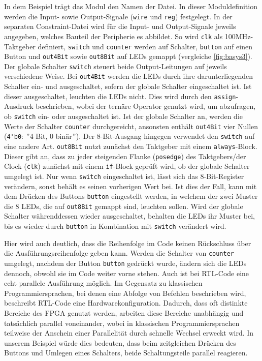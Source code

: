     In dem Beispiel trägt das Modul den Namen der Datei.
    In dieser Moduldefinition werden die Input- sowie Output-Signale (\verb|wire| und \verb|reg|) festgelegt.
    In der separaten Constraint-Datei wird für die Input- und Output-Signale jeweils angegeben, welches Bauteil der Peripherie es abbildet.
    So wird \verb|clk| als 100MHz-Taktgeber definiert, \verb|switch| und \verb|counter| werden auf Schalter, \verb|button| auf einen Button und \verb|out4Bit| sowie \verb|out8Bit| auf LEDs gemappt (vergleiche \cref{fig:basys3}).
    Der globale Schalter \verb|switch| steuert beide Output-Leitungen auf jeweils verschiedene Weise.
    Bei \verb|out4Bit| werden die LEDs durch ihre darunterliegenden Schalter ein- und ausgeschaltet, sofern der globale Schalter eingeschaltet ist.
    Ist dieser ausgeschaltet, leuchten die LEDs nicht.
    Dies wird durch den \verb|assign|-Ausdruck beschrieben, wobei der ternäre Operator genutzt wird, um abzufragen, ob \verb|switch| ein- oder ausgeschaltet ist.
    Ist der globale Schalter an, werden die Werte der Schalter \verb|counter| durchgereicht, ansonsten enthält \verb|out4Bit| vier Nullen (\verb|4'b0|: \("\)4 Bit, 0 binär\("\)).
    Der 8-Bit-Ausgang hingegen verwendet den \verb|switch| auf eine andere Art.
    \verb|out8Bit| nutzt zunächst den Taktgeber mit einem \verb|always|-Block.
    Dieser gibt an, dass zu jeder steigenden Flanke (\verb|posedge|) des Taktgebers/der Clock (\verb|clk|) zunächst mit einem \verb|if|-Block geprüft wird, ob der globale Schalter umgelegt ist.
    Nur wenn \verb|switch| eingeschaltet ist, lässt sich das 8-Bit-Register verändern, sonst behält es seinen vorherigen Wert bei.
    Ist dies der Fall, kann mit dem Drücken des Buttons \verb|button| eingestellt werden, in welchem der zwei Muster die 8 LEDs, die auf \verb|out8Bit| gemappt sind, leuchten sollen.
    Wird der globale Schalter währenddessen wieder ausgeschaltet, behalten die LEDs ihr Muster bei, bis es wieder durch \verb|button| in Kombination mit \verb|switch| verändert wird.

    Hier wird auch deutlich, dass die Reihenfolge im Code keinen Rückschluss über die Ausführungsreihenfolge geben kann.
    Werden die Schalter von \verb|counter| umgelegt, nachdem der Button \verb|button| gedrückt wurde, ändern sich die LEDs dennoch, obwohl sie im Code weiter vorne stehen.
    Auch ist bei RTL-Code eine echt parallele Ausführung möglich.
    Im Gegensatz zu klassischen Programmiersprachen, bei denen eine Abfolge von Befehlen beschrieben wird, beschreibt RTL-Code eine Hardwarekonfiguration.
    Dadurch, dass oft distinkte Bereiche des FPGA genutzt werden, arbeiten diese Bereiche unabhängig und tatsächlich parallel voneinander, wobei in klassischen Programmiersprachen teilweise der Anschein einer Parallelität durch schnelle Wechsel erweckt wird.
    In unserem Beispiel würde dies bedeuten, dass beim zeitgleichen Drücken des Buttons und Umlegen eines Schalters, beide Schaltungsteile parallel reagieren.

